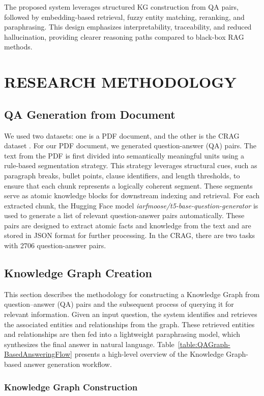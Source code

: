 The proposed system leverages structured KG construction from QA pairs, followed by embedding-based retrieval, fuzzy entity matching, reranking, and paraphrasing. This design emphasizes interpretability, traceability, and reduced hallucination, providing clearer reasoning paths compared to black-box RAG methods.

\section{RESEARCH METHODOLOGY}

\subsection{QA Generation from Document}
We used two datasets: one is a PDF document, and the other is the CRAG dataset \cite{yang2024crag}. For our PDF document, we generated question-answer (QA) pairs. The text from the PDF is first divided into semantically meaningful units using a rule-based segmentation strategy. This strategy leverages structural cues, such as paragraph breaks, bullet points, clause identifiers, and length thresholds, to ensure that each chunk represents a logically coherent segment. These segments serve as atomic knowledge blocks for downstream indexing and retrieval. For each extracted chunk, the Hugging Face model \textit{iarfmoose/t5-base-question-generator} is used to generate a list of relevant question-answer pairs automatically. These pairs are designed to extract atomic facts and knowledge from the text and are stored in JSON format for further processing. In the CRAG, there are two tasks with 2706 question-answer pairs.

\subsection{Knowledge Graph Creation}
This section describes the methodology for constructing a Knowledge Graph from question–answer (QA) pairs and the subsequent process of querying it for relevant information. Given an input question, the system identifies and retrieves the associated entities and relationships from the graph. These retrieved entities and relationships are then fed into a lightweight paraphrasing model, which synthesizes the final answer in natural language. Table~\ref{table:QAGraph-BasedAnsweringFlow} presents a high-level overview of the Knowledge Graph-based answer generation workflow.


\subsubsection{Knowledge Graph Construction} 

